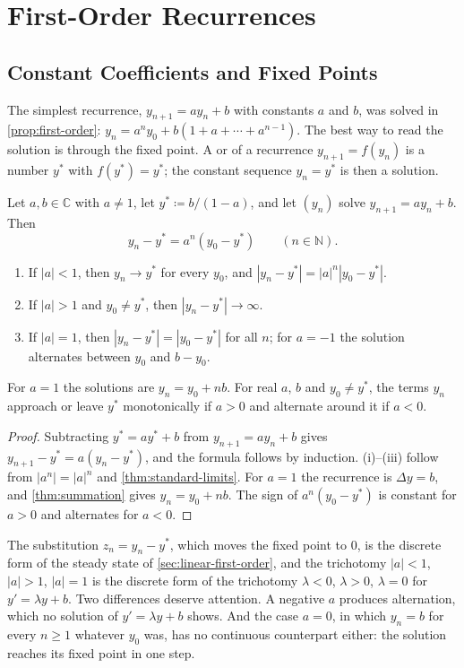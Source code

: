 \section{First-Order Recurrences}
\label{sec:first-order-recurrences}

\subsection{Constant Coefficients and Fixed Points}

The simplest recurrence, $y_{n+1}=ay_n+b$ with constants $a$ and $b$, was solved in \cref{prop:first-order}: $y_n=a^ny_0+b(1+a+\cdots+a^{n-1})$. The best way to read the solution is through the fixed point. A  or  of a recurrence $y_{n+1}=f(y_n)$ is a number $y^*$ with $f(y^*)=y^*$; the constant sequence $y_n=y^*$ is then a solution.

\begin{proposition}
\label{prop:first-order-constant}
Let $a,b\in\mathbb C$ with $a\ne1$, let $y^*\coloneqq b/(1-a)$, and let $(y_n)$ solve $y_{n+1}=ay_n+b$. Then
\[
y_n-y^*=a^n(y_0-y^*)\qquad(n\in\mathbb N).
\]
\begin{enumerate}
\item If $|a|<1$, then $y_n\to y^*$ for every $y_0$, and $|y_n-y^*|=|a|^n|y_0-y^*|$.
\item If $|a|>1$ and $y_0\ne y^*$, then $|y_n-y^*|\to\infty$.
\item If $|a|=1$, then $|y_n-y^*|=|y_0-y^*|$ for all $n$; for $a=-1$ the solution alternates between $y_0$ and $b-y_0$.
\end{enumerate}
For $a=1$ the solutions are $y_n=y_0+nb$. For real $a$, $b$ and $y_0\ne y^*$, the terms $y_n$ approach or leave $y^*$ monotonically if $a>0$ and alternate around it if $a<0$.
\end{proposition}

\begin{proof}
Subtracting $y^*=ay^*+b$ from $y_{n+1}=ay_n+b$ gives $y_{n+1}-y^*=a(y_n-y^*)$, and the formula follows by induction. (i)--(iii) follow from $|a^n|=|a|^n$ and \cref{thm:standard-limits}. For $a=1$ the recurrence is $\Delta y=b$, and \cref{thm:summation} gives $y_n=y_0+nb$. The sign of $a^n(y_0-y^*)$ is constant for $a>0$ and alternates for $a<0$.
\end{proof}

The substitution $z_n=y_n-y^*$, which moves the fixed point to $0$, is the discrete form of the steady state of \cref{sec:linear-first-order}, and the trichotomy $|a|<1$, $|a|>1$, $|a|=1$ is the discrete form of the trichotomy $\lambda<0$, $\lambda>0$, $\lambda=0$ for $y'=\lambda y+b$. Two differences deserve attention. A negative $a$ produces alternation, which no solution of $y'=\lambda y+b$ shows. And the case $a=0$, in which $y_n=b$ for every $n\ge1$ whatever $y_0$ was, has no continuous counterpart either: the solution reaches its fixed point in one step.


